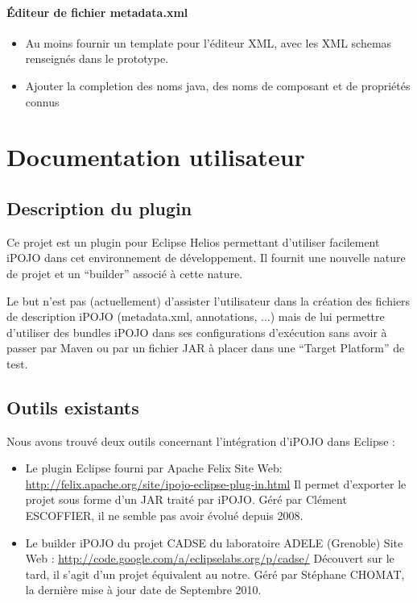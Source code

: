 \documentclass[letterpaper,10pt,french]{sphinxmanual}
\begin{document}
\subsubsection{Éditeur de fichier metadata.xml}
\label{developer/index:editeur-de-fichier-metadata-xml}\begin{itemize}
\item {} 
Au moins fournir un template pour l'éditeur XML, avec les XML schemas
renseignés dans le prototype.

\item {} 
Ajouter la completion des noms java, des noms de composant et de propriétés
connus

\end{itemize}


\chapter{Documentation utilisateur}
\label{user/index:documentation-utilisateur}\label{user/index::doc}

\section{Description du plugin}
\label{user/index:description-du-plugin}
Ce projet est un plugin pour Eclipse Helios permettant d'utiliser facilement
iPOJO dans cet environnement de développement.
Il fournit une nouvelle nature de projet et un ``builder'' associé à cette nature.

Le but n'est pas (actuellement) d'assister l'utilisateur dans la création des
fichiers de description iPOJO (metadata.xml, annotations, ...) mais de lui
permettre d'utiliser des bundles iPOJO dans ses configurations d'exécution sans
avoir à passer par Maven ou par un fichier JAR à placer dans une
``Target Platform'' de test.


\section{Outils existants}
\label{user/index:outils-existants}
Nous avons trouvé deux outils concernant l'intégration d'iPOJO dans Eclipse :
\begin{itemize}
\item {} 
Le plugin Eclipse fourni par Apache Felix
Site Web: \href{http://felix.apache.org/site/ipojo-eclipse-plug-in.html}{http://felix.apache.org/site/ipojo-eclipse-plug-in.html}
Il permet d'exporter le projet sous forme d'un JAR traité par iPOJO.
Géré par Clément ESCOFFIER, il ne semble pas avoir évolué depuis 2008.

\item {} 
Le builder iPOJO du projet CADSE du laboratoire ADELE (Grenoble)
Site Web : \href{http://code.google.com/a/eclipselabs.org/p/cadse/}{http://code.google.com/a/eclipselabs.org/p/cadse/}
Découvert sur le tard, il s'agit d'un projet équivalent au notre.
Géré par Stéphane CHOMAT, la dernière mise à jour date de Septembre 2010.

\end{itemize}
\end{document}
